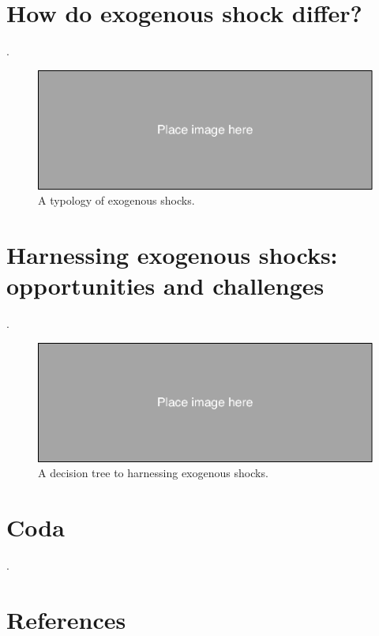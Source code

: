 \begin{refsection}
\section{How do exogenous shock differ?}
\label{sec:how_exogenous_shocks_differ}

.

\begin{figure}[!htbp]
  \includegraphics[width=1\textwidth]{exhibits/place_holder.pdf}
  \caption{A typology of exogenous shocks.}
  \label{fig:exogeneous_shocks_types}
\end{figure}

\section{Harnessing exogenous shocks: opportunities and challenges}
\label{sec:how_exogenous_shocks_differ}

.

\begin{figure}[!htbp]
  \includegraphics[width=1\textwidth]{exhibits/place_holder.pdf}
  \caption{A decision tree to harnessing exogenous shocks.}
  \label{fig:harnessing_exogeneous_shocks}
\end{figure}

\section{Coda}
\label{sec:coda}
.

%
\section{References}
\printbibliography[heading=none]
\end{refsection}

